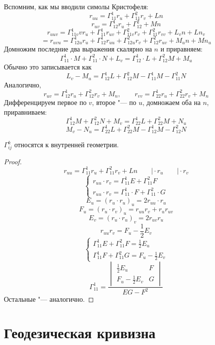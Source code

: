 Вспомним, как мы вводили симолы Кристофеля:
$$ r_{uu} = \Gamma_{11}^1 r_u + \Gamma_{11}^2 r_v + Ln $$
$$ r_{uv} = \Gamma_{12}^1r_u + \Gamma_{12}^2 + Mn $$
$$ r_{uuv} = \Gamma_{11v}^1vr_u + \Gamma_{11}^1r_{uv} + \Gamma_{11v}^2r_v + \Gamma_{11}^2r_{vv} + L_vn + Ln_v $$
$$ = r_{uvu} = \Gamma_{12u}^1r_u + \Gamma_{12}^1r_{uu} + \Gamma_{12u}^2r_v + \Gamma_{12}^2r_{uv} + M_un + Mn_u $$
Домножим последние два выражения скалярно на $ n $ и приравняем:
$$ \Gamma_{11}^1 \cdot M + \Gamma_{11}^2 \cdot N + L_v = \Gamma_{12}^1 \cdot L + \Gamma_{12}^2M + M_u $$
Обычно это записывается как
$$ \boxed{L_v - M_u = \Gamma_{12}^1L + \Gamma_{12}^2M - \Gamma_{11}^1M - \Gamma_{11}^2N} $$
Аналогично,
$$ r_{uv} = \Gamma_{12}^1r_u + \Gamma_{12}^2r_v + M_n, \qquad r_{vv} = \Gamma_{22}^1r_u + \Gamma_{22}^2r_v + M_n $$
Дифференцируем первое по $ v $, второе "--- по $ u $, домножаем оба на $ n $, приравниваем:
$$ \Gamma_{12}^1M + \Gamma_{12}^2N + M_v = \Gamma_{22}^1L + \Gamma_{22}^2M + N_u $$
$$ \boxed{M_v - N_u = \Gamma_{22}^1L + \Gamma_{22}^2M - \Gamma_{12}^1M - \Gamma_{12}^2N} $$

\begin{theorem}
	$ \Gamma_{ij}^k $ относятся к внутренней геометрии.
\end{theorem}

\begin{proof}
	$$ r_{uu} = \Gamma_{11}^1r_u + \Gamma_{11}^2 r_v + Ln \qquad \bigg| \cdot r_u \qquad \bigg| \cdot r_v $$
	$$
	\begin{cases}
		r_{uu} \cdot r_v = \Gamma_{11}^1E + \Gamma_{11}^2F \\
		r_{uu} \cdot r_v = \Gamma_{11}^1 \cdot F + \Gamma_{11}^2 \cdot G
	\end{cases} $$
	$$ E_u = (r_u \cdot r_u)_u = 2r_{uu} \cdot r_u $$
	$$ F_u = (r_u \cdot r_v)_u = r_{uu} r_v + r_ur_{uv} $$
	$$ E_v = (r_u \cdot r_u)_v = 2r_{uv}r_u $$
	$$ r_{uu}r_v = F_u - \frac12 E_v $$
	$$
	\begin{cases}
		\Gamma_{11}^1E + \Gamma_{11}^2F = \frac12 E_u \\
		\Gamma_{11}^1F + \Gamma_{11}^2G = F_u - \frac12 E_v
	\end{cases} $$
	$$ \boxed{\Gamma_{11}^1 = \frac{
			\begin{vmatrix}
				\frac12E_u & F \\
				F_u - \frac12 E_v & G
			\end{vmatrix}}{EG - F^2}} $$
	Остальные "--- аналогично.
\end{proof}

\chapter{Геодезическая кривизна}

